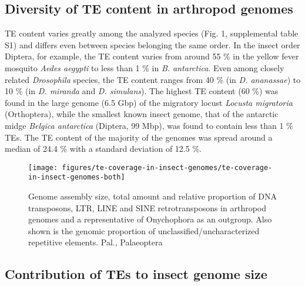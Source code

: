 \subsection{Diversity of TE content in arthropod
genomes}\label{diversity-of-te-content-in-arthropod-genomes}

TE content varies greatly among the analyzed species (Fig. 1,
supplemental table S1) and differs even between species belonging the
same order. In the insect order Diptera, for example, the TE content
varies from around 55 \% in the yellow fever mosquito \emph{Aedes
aegypti} to less than 1 \% in \emph{B. antarctica}. Even among closely
related \emph{Drosophila} species, the TE content ranges from 40 \% (in
\emph{D. ananassae}) to 10 \% (in \emph{D. miranda} and \emph{D.
simulans}). The highest TE content (60 \%) was found in the large genome
(6.5 Gbp) of the migratory locust \emph{Locusta migratoria}
(Orthoptera), while the smallest known insect genome, that of the
antarctic midge \emph{Belgica antarctica} (Diptera, 99 Mbp), was found
to contain less than 1 \% TEs. The TE content of the majority of the
genomes was spread around a median of 24.4 \% with a standard deviation
of 12.5 \%.

\begin{figure}[h!]
\begin{center}
\texttt{[image: figures/te-coverage-in-insect-genomes/te-coverage-in-insect-genomes-both]}
\caption[TE coverage in arthropod genomes]{{Genome assembly size, total
amount and relative proportion of DNA transposons, LTR, LINE and SINE
retrotransposons in arthropod genomes and a representative of
Onychophora as an outgroup. Also shown is the genomic proportion of
unclassified/uncharacterized repetitive elements.  Pal., Palaeoptera%
}}
\end{center}
\end{figure}

\subsection{Contribution of TEs to insect genome
size}\label{contribution-of-tes-to-insect-genome-size}

